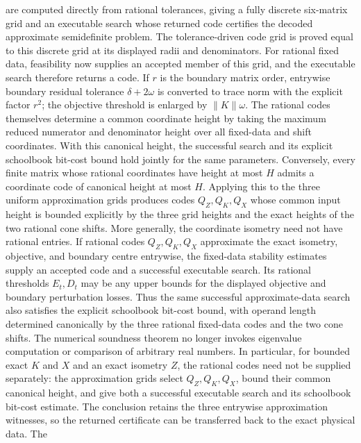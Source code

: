 \begin{lemma}
    are computed directly from rational tolerances, giving a fully discrete
    six-matrix grid and an executable search whose returned code certifies the
    decoded approximate semidefinite problem.
    The tolerance-driven code grid is proved equal to this discrete grid at its
    displayed radii and denominators.  For rational fixed data, feasibility now
    supplies an accepted member of this grid, and the executable search therefore
    returns a code.  If $r$ is the boundary matrix order, entrywise boundary
    residual tolerance $\delta+2\omega$ is converted to trace norm with the
    explicit factor $r^2$; the objective threshold is enlarged by
    $\lVert K\rVert\omega$.  The rational codes themselves determine a common
    coordinate height by taking the maximum reduced numerator and denominator
    height over all fixed-data and shift coordinates.  With this canonical
    height, the successful search and its explicit schoolbook bit-cost bound
    hold jointly for the same parameters.  Conversely, every finite matrix
    whose rational coordinates have height at most $H$ admits a coordinate
    code of canonical height at most $H$.  Applying this to the three uniform
    approximation grids produces codes $Q_Z,Q_K,Q_X$ whose common input height
    is bounded explicitly by the three grid heights and the exact heights of
    the two rational cone shifts.  More generally, the coordinate
    isometry need not have rational entries.  If rational codes $Q_Z,Q_K,Q_X$
    approximate the exact isometry, objective, and boundary centre entrywise,
    the fixed-data stability estimates supply an accepted code and a successful
    executable search.  Its rational thresholds $E_t,D_t$ may be any upper
    bounds for the displayed objective and boundary perturbation losses.  Thus the
    same successful approximate-data search also satisfies the explicit schoolbook
    bit-cost bound, with operand length determined canonically by the three rational
    fixed-data codes and the two cone shifts.  The
    numerical soundness theorem no longer
    invokes eigenvalue computation or comparison of arbitrary real numbers.
    In particular, for bounded exact $K$ and $X$ and an exact isometry $Z$, the
    rational codes need not be supplied separately: the approximation grids
    select $Q_Z,Q_K,Q_X$, bound their common canonical height, and give both a
    successful executable search and its schoolbook bit-cost estimate.  The
    conclusion retains the three entrywise approximation witnesses, so the
    returned certificate can be transferred back to the exact physical data.  The

\end{lemma}
